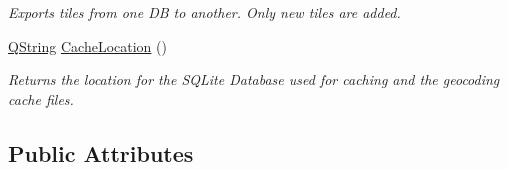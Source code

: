\begin{DoxyCompactItemize}
\begin{DoxyCompactList}\small\item\em \-Exports tiles from one \-D\-B to another. \-Only new tiles are added. \end{DoxyCompactList}\item 
\hyperlink{group___u_a_v_objects_plugin_gab9d252f49c333c94a72f97ce3105a32d}{\-Q\-String} \hyperlink{group___o_p_map_widget_ga1edc453f938348b4b2400fe6310bae75}{\-Cache\-Location} ()
\begin{DoxyCompactList}\small\item\em \-Returns the location for the \-S\-Q\-Lite \-Database used for caching and the geocoding cache files. \end{DoxyCompactList}\end{DoxyCompactItemize}
\subsection*{\-Public \-Attributes}
